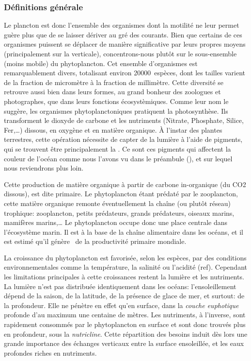 \subsubsection{Définitions générale}
\label{sec:phyto-def-gen}

Le plancton est donc l'ensemble des organismes dont la motilité ne leur permet guère plus que de se laisser dériver au gré des courants.
Bien que certains de ces organismes puissent se déplacer de manière significative par leurs propres moyens (principalement sur la verticale), concentrons-nous plutôt sur le sous-ensemble (moins mobile) du phytoplancton.
Cet ensemble d'organismes est remarquablement divers, totalisant environ \num{20 000}~espèces, dont les tailles varient de la fraction de micromètre à la fraction de millimètre. Cette diversité se retrouve aussi bien dans leurs formes, au grand bonheur des zoologues et photographes, que dans leurs fonctions écosystèmiques.
Comme leur nom le suggère, les organismes phytoplanctoniques pratiquent la photosynthèse.
Ils transforment le dioxyde de carbone et les nutriments (Nitrate, Phosphate, Silice, Fer,\dots) dissous, en oxygène et en matière organique.
À l'instar des plantes terrestres, cette opération nécessite de capter de la lumière à l'aide de pigments, qui se trouvent être principalement la .
Ce sont ces pigments qui affectent la couleur de l'océan comme nous l'avons vu dans le préambule (), et sur lequel nous reviendrons plus loin.

Cette production de matière organique à partir de carbone in-organique (du CO2 dissous), est dite primaire.
Le phytoplancton étant prédaté par le zooplancton, cette matière organique remonte éventuellement la chaîne (ou plutôt réseau) trophique: zooplancton, petits prédateurs, grands prédateurs, oiseaux marins, mamifères marins,\dots
Le phytoplancton occupe donc une place centrale dans l'écosystème marin.
Il est à la base de la chaîne alimentaire dans les océans, et il est estimé qu'il génère~ de la productivité primaire mondiale.

La croissance du phytoplancton est favorisée, selon les espèces, par des conditions environnementales comme la température, la salinité ou l'acidité (ref).
Cependant les limitations principales à cette croissances restent la lumière et les nutriments.
La lumière n'est pas distribuée identiquement dans les océans: l'ensoleillement dépend de la saison, de la latitude, de la présence de glace de mer, et surtout: de la profondeur.
Elle ne pénètre en effet qu'en surface, dans la \emph{couche euphotique} profonde d'au maximum une centaine de mètres.
Les nutriments, à l'inverse, sont rapidement consommés par le phytoplancton en surface et sont donc trouvés plus en profondeur, sous la \emph{nutricline}.
Cette répartition des besoins induit dès lors une grande importance des échanges verticaux entre la surface ensoleillée, et les eaux profondes riches en nutriments.


